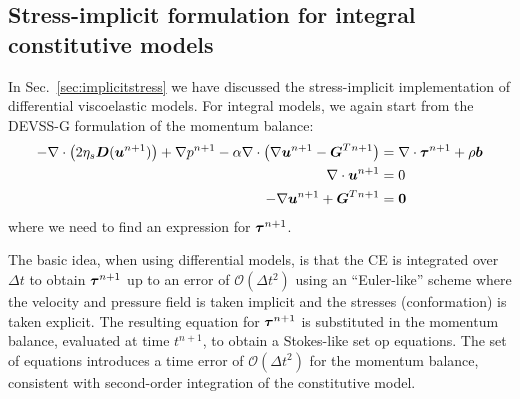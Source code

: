 \subsection{Stress-implicit formulation for integral constitutive models}
\label{sec:df_stress_implicit}

In Sec.~\ref{sec:implicitstress} we have discussed the stress-implicit implementation of differential viscoelastic models. 
For integral models, we again start from the DEVSS-G formulation of the momentum balance:
\begin{equation}
\begin{split}
      -\nabla\cdot\big(2\eta_s\boldsymbol{D}(\boldsymbol{u}^{n+1})\big) +\nabla p^{n+1} 
  -\alpha\nabla\cdot\big(\nabla\boldsymbol{u}^{n+1} -\boldsymbol{G}^T{}^{n+1} \big)
&=\nabla\cdot\boldsymbol{\tau}^{n+1}
        + \rho\boldsymbol{b}\\
     \nabla\cdot\boldsymbol{u}^{n+1}&=0\\
   -\nabla\boldsymbol{u}^{n+1} + \boldsymbol{G}^T{}^{n+1} &= \boldsymbol{0}\label{eq:devssgint}
\end{split}
\end{equation}
where we need to find an expression for $\boldsymbol{\tau}^{n+1}$.

The basic idea, when using differential models, is that the CE is integrated over $\Delta t$ to obtain $\boldsymbol{\tau}^{n+1}$ up to an error of $\mathcal{O}(\Delta t^2)$ using an ``Euler-like'' scheme where the velocity and pressure field is taken implicit and the stresses (conformation) is taken explicit. The resulting equation for $\boldsymbol{\tau}^{n+1}$ is substituted in the momentum balance, evaluated at time $t^{n+1}$, to obtain a Stokes-like set op equations. The set of equations introduces a time error of 
$\mathcal{O}(\Delta t^2)$ for the momentum balance, consistent with second-order integration of the constitutive model.

